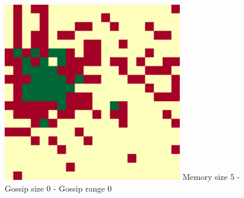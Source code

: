 \documentclass[english]{article}
\begin{document}
\begin{figure}[!h]
{    \includegraphics[width=\textwidth/3]{spatial-memory0+gossip0+range0-C.pdf}
  }
  Memory size 5 - Gossip size 0 - Gossip range 0
\end{figure}
\end{document}
